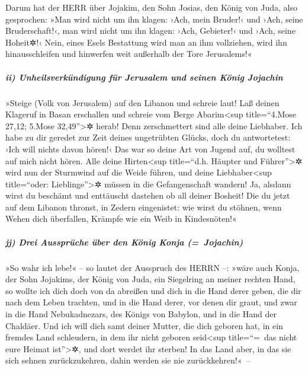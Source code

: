 Darum hat der HERR über Jojakim, den Sohn Josias, den
König von Juda, also gesprochen: »Man wird nicht um ihn klagen: ›Ach,
mein Bruder!‹ und ›Ach, seine Bruderschaft!‹, man wird nicht um ihn
klagen: ›Ach, Gebieter!‹ und ›Ach, seine Hoheit✲!‹ Nein,
eines Esels Bestattung wird man an ihm vollziehen, wird ihn
hinausschleifen und hinwerfen weit außerhalb der Tore Jerusalems!«

\hypertarget{ii-unheilsverkuxfcndigung-fuxfcr-jerusalem-und-seinen-kuxf6nig-jojachin}{%
\subparagraph{ii) Unheilsverkündigung für Jerusalem und seinen König
Jojachin}\label{ii-unheilsverkuxfcndigung-fuxfcr-jerusalem-und-seinen-kuxf6nig-jojachin}}

»Steige (Volk von Jerusalem) auf den Libanon und schreie
laut! Laß deinen Klageruf in Basan erschallen und schreie vom Berge
Abarim\textless sup title=``4.Mose 27,12; 5.Mose 32,49''\textgreater✲
herab! Denn zerschmettert sind alle deine Liebhaber. Ich
habe zu dir geredet zur Zeit deines ungetrübten Glücks, doch du
antwortetest: ›Ich will nichts davon hören!‹ Das war so deine Art von
Jugend auf, du wolltest auf mich nicht hören. Alle deine
Hirten\textless sup title=``d.h. Häupter und Führer''\textgreater✲ wird
nun der Sturmwind auf die Weide führen, und deine Liebhaber\textless sup
title=``oder: Lieblinge''\textgreater✲ müssen in die Gefangenschaft
wandern! Ja, alsdann wirst du beschämt und enttäuscht dastehen ob all
deiner Bosheit! Die du jetzt auf dem Libanon thronst, in
Zedern eingenistet: wie wirst du stöhnen, wenn Wehen dich überfallen,
Krämpfe wie ein Weib in Kindesnöten!«

\hypertarget{jj-drei-ausspruxfcche-uxfcber-den-kuxf6nig-konja-jojachin}{%
\subparagraph{jj) Drei Aussprüche über den König Konja
(=~Jojachin)}\label{jj-drei-ausspruxfcche-uxfcber-den-kuxf6nig-konja-jojachin}}

»So wahr ich lebe!« -- so lautet der Ausspruch des HERRN
--: »wäre auch Konja, der Sohn Jojakims, der König von Juda, ein
Siegelring an meiner rechten Hand, so wollte ich dich doch von da
abreißen und dich in die Hand derer geben, die dir nach
dem Leben trachten, und in die Hand derer, vor denen dir graut, und zwar
in die Hand Nebukadnezars, des Königs von Babylon, und in die Hand der
Chaldäer. Und ich will dich samt deiner Mutter, die dich
geboren hat, in ein fremdes Land schleudern, in dem ihr nicht geboren
seid\textless sup title=``=~das nicht eure Heimat ist''\textgreater✲,
und dort werdet ihr sterben! In das Land aber, in das sie
sich sehnen zurückzukehren, dahin werden sie nie zurückkehren!«~--

